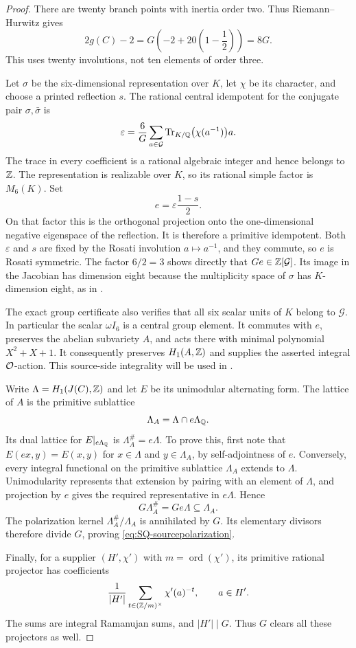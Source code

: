 \begin{proof}
There are twenty branch points with inertia order two. Thus Riemann--Hurwitz gives
\[
 2g(C)-2=G\left(-2+20\left(1-\frac12\right)\right)=8G.
\]
This uses twenty involutions, not ten elements of order three.

Let $\sigma$ be the six-dimensional representation over $K$, let $\chi$ be its character, and choose a printed reflection $s$. The rational central idempotent for the conjugate pair $\sigma,\bar\sigma$ is
\[
 \varepsilon=\frac6G\sum_{a\in\mathcal G}
       \operatorname{Tr}_{K/\mathbb Q}\bigl(\chi(a^{-1})\bigr)a.
\]
The trace in every coefficient is a rational algebraic integer and hence belongs to $\mathbb Z$. The representation is realizable over $K$, so its rational simple factor is $M_6(K)$. Set
\[
 e=\varepsilon\frac{1-s}{2}.
\]
On that factor this is the orthogonal projection onto the one-dimensional negative eigenspace of the reflection. It is therefore a primitive idempotent. Both $\varepsilon$ and $s$ are fixed by the Rosati involution $a\mapsto a^{-1}$, and they commute, so $e$ is Rosati symmetric. The factor $6/2=3$ shows directly that $Ge\in\mathbb Z[\mathcal G]$. Its image in the Jacobian has dimension eight because the multiplicity space of $\sigma$ has $K$-dimension eight, as in \citet[Section~3, Definition \texttt{def:pt} and Lemma \texttt{lem:weiltype}]{Severn26}.

The exact group certificate also verifies that all six scalar units of $K$ belong to $\mathcal G$. In particular the scalar $\omega I_6$ is a central group element. It commutes with $e$, preserves the abelian subvariety $A$, and acts there with minimal polynomial $X^2+X+1$. It consequently preserves $H_1(A,\mathbb Z)$ and supplies the asserted integral $\mathcal O$-action. This source-side integrality will be used in .

Write $\Lambda=H_1(J(C),\mathbb Z)$ and let $E$ be its unimodular alternating form. The lattice of $A$ is the primitive sublattice
\[
 \Lambda_A=\Lambda\cap e\Lambda_\mathbb Q.
\]
Its dual lattice for $E|_{e\Lambda_\mathbb Q}$ is $\Lambda_A^\#=e\Lambda$. To prove this, first note that $E(ex,y)=E(x,y)$ for $x\in\Lambda$ and $y\in\Lambda_A$, by self-adjointness of $e$. Conversely, every integral functional on the primitive sublattice $\Lambda_A$ extends to $\Lambda$. Unimodularity represents that extension by pairing with an element of $\Lambda$, and projection by $e$ gives the required representative in $e\Lambda$. Hence
\[
 G\Lambda_A^\#=Ge\Lambda\subseteq\Lambda_A.
\]
The polarization kernel $\Lambda_A^\#/\Lambda_A$ is annihilated by $G$. Its elementary divisors therefore divide $G$, proving \eqref{eq:SQ-sourcepolarization}.

Finally, for a supplier $(H',\chi')$ with $m=\operatorname{ord}(\chi')$, its primitive rational projector has coefficients
\[
 \frac1{|H'|}\sum_{t\in(\mathbb Z/m)^\times}\chi'(a)^{-t},\qquad a\in H'.
\]
The sums are integral Ramanujan sums, and $|H'|\mid G$. Thus $G$ clears all these projectors as well.
\end{proof}

